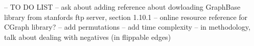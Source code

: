 -- TO DO LIST
    -- ask about adding reference about dowloading GraphBase library from stanfords ftp server, section 1.10.1
    -- online resource reference for CGraph library?
    -- add permutations
    -- add time complexity 
    -- in methodology, talk about dealing with negatives (in flippable edges)
